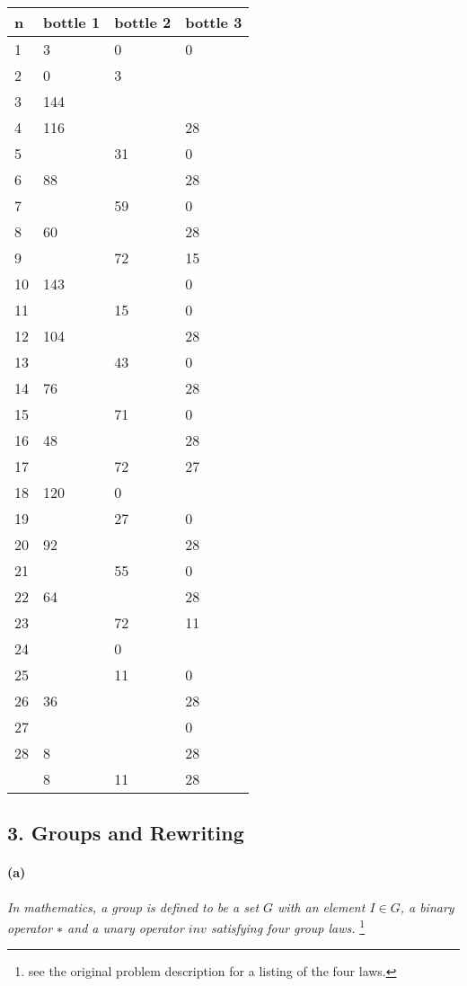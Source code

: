 \documentclass[12pt]{article}
\begin{document}
\begin{tabular}{|l|l|l|l|}
    \hline  
    n & bottle 1    & bottle 2  & bottle 3  \\  
    \hline \hline
    1 & 3   & 0     & 0 \\  
    2 & 0   & 3     &   \\  
    3 & 144 &       &    \\  
    4 & 116 &       & 28 \\  
    5 &     & 31    & 0 \\  
    6 & 88  &       & 28 \\  
    7 &     & 59    & 0 \\  
    8 & 60  &       & 28 \\  
    9 &     & 72    & 15 \\  
    10& 143 &       & 0 \\  
    11&     & 15    & 0 \\  
    12& 104 &       & 28 \\  
    13&     & 43    & 0 \\  
    14& 76  &       & 28 \\  
    15&     & 71    & 0 \\  
    16& 48  &       & 28 \\
    17&     & 72    & 27 \\  
    18& 120 & 0     &  \\  
    19&     & 27    & 0 \\  
    20& 92  &       & 28 \\  
    21&     & 55    & 0 \\  
    22& 64  &       & 28 \\  
    23&     & 72    & 11 \\  
    24&     & 0     &   \\  
    25&     & 11    & 0 \\  
    26& 36  &       & 28 \\  
    27&     &       & 0 \\  
    28& 8   &       & 28 \\  
    \hline
      & 8   & 11    & 28 \\  
    \hline
\end{tabular}

\subsection*{3. Groups and Rewriting}
\paragraph{(a)} 
\textit{In mathematics, a group is defined to be a set $G$ with an 
element $I \in G$, a binary operator $∗$ and a unary operator $inv$ satisfying 
four group laws.} \footnote{see the original problem description for a listing
of the four laws.}
\end{document}
